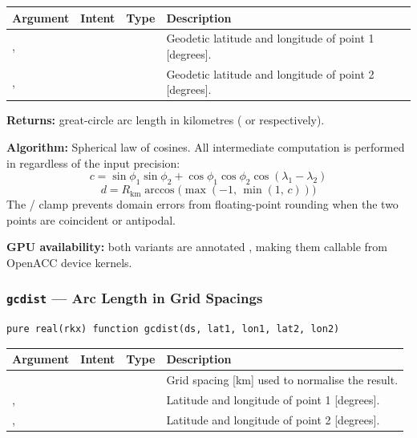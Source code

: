 \begin{longtable}{L{2.5cm} L{2.5cm} L{3cm} L{6cm}}
  \toprule
  \textbf{Argument} & \textbf{Intent} & \textbf{Type} & \textbf{Description} \\
  \midrule
  \endhead
  \bottomrule
  \endfoot
  ,  &  &  &
    Geodetic latitude and longitude of point 1 [degrees]. \\
  ,  &  &  &
    Geodetic latitude and longitude of point 2 [degrees]. \\
\end{longtable}

\textbf{Returns:} great-circle arc length in kilometres ( or
 respectively).

\textbf{Algorithm:} Spherical law of cosines. All intermediate computation
is performed in  regardless of the input precision:
\[
  c = \sin\phi_1\sin\phi_2 + \cos\phi_1\cos\phi_2\cos(\lambda_1-\lambda_2)
\]
\[
  d = R_\text{km}\arccos\!\bigl(\max(-1,\,\min(1,\,c))\bigr)
\]
The / clamp prevents  domain errors from
floating-point rounding when the two points are coincident or antipodal.

\textbf{GPU availability:} both variants are annotated ,
making them callable from OpenACC device kernels.

\subsubsection{\texttt{gcdist} --- Arc Length in Grid Spacings}

\begin{lstlisting}
pure real(rkx) function gcdist(ds, lat1, lon1, lat2, lon2)
\end{lstlisting}

\begin{longtable}{L{2.5cm} L{2.5cm} L{3cm} L{6cm}}
  \toprule
  \textbf{Argument} & \textbf{Intent} & \textbf{Type} & \textbf{Description} \\
  \midrule
  \endhead
  \bottomrule
  \endfoot
             &  &  &
    Grid spacing [km] used to normalise the result. \\
  ,  &  &  &
    Latitude and longitude of point 1 [degrees]. \\
  ,  &  &  &
    Latitude and longitude of point 2 [degrees]. \\
\end{longtable}

